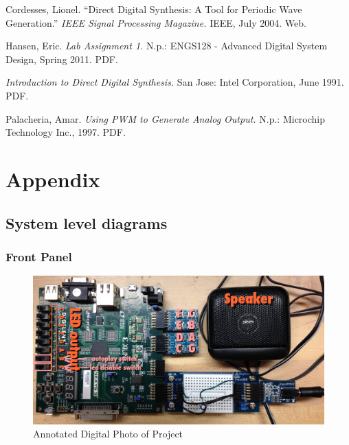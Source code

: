 \documentclass{article}
\begin{document}
  \begin{thebibliography}{9}

  	Cordesses, Lionel.
  	``Direct Digital Synthesis: A Tool for Periodic Wave Generation.''
  	\emph{IEEE Signal Processing Magazine.}
  	IEEE,
  	July 2004. 
  	Web.  	

  	Hansen, Eric.
  	\emph{Lab Assignment 1.}
  	N.p.:
  	ENGS128 - Advanced Digital System Design, Spring 2011.
  	PDF.

  	\emph{Introduction to Direct Digital Synthesis.}
  	San Jose: Intel Corporation,
  	June 1991.
  	PDF.

  	Palacheria, Amar.
  	\emph{Using PWM to Generate Analog Output.}
  	N.p.: Microchip Technology Inc.,
  	1997.
  	PDF.

  \end{thebibliography}

\newpage
\section{Appendix}
  	\listoffigures
  	\listoftables
    \singlespacing

  	\newpage
  	\subsection{System level diagrams}

    \subsubsection{Front Panel}
      

	    \begin{figure}[H]
	    	\centering
	    	\includegraphics[width=6.5in]{img/annotated.jpg}
	    	\caption{Annotated Digital Photo of Project}
	    \end{figure}
\end{document}
